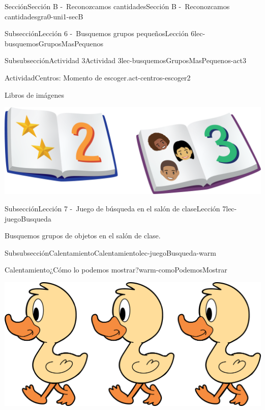 \documentclass[twoside,10pt,]{article}
\begin{document}
\begin{sectionptx}{Sección}{Sección B -~Reconozcamos cantidades}{}{Sección B -~Reconozcamos cantidades}{}{}{gra0-uni1-secB}
\begin{subsectionptx}{Subsección}{Lección 6 -~Busquemos grupos pequeños}{}{Lección 6}{}{}{lec-busquemosGruposMasPequenos}
\begin{subsubsectionptx}{Subsubsección}{Actividad 3}{}{Actividad 3}{}{}{lec-busquemosGruposMasPequenos-act3}
\begin{activity}{Actividad}{Centros: Momento de escoger.}{act-centros-escoger2}
\begin{sidebyside}{2}{0.025}{0.025}{0.05}
\begin{sbspanel}{0.45}%
Libros de imágenes%
\par
\includegraphics[width=\linewidth]{external/png-source/K.1.D Beta Student Workbooks.Books.png}
\end{sbspanel}%
\end{sidebyside}%
\end{activity}%
\end{subsubsectionptx}
\end{subsectionptx}
%
%
\typeout{************************************************}
\typeout{************************************************}
%
\begin{subsectionptx}{Subsección}{Lección 7 -~Juego de búsqueda en el salón de clase}{}{Lección 7}{}{}{lec-juegoBusqueda}
\begin{introduction}{}%
Busquemos grupos de objetos en el salón de clase.%
\end{introduction}%
%
%
\typeout{************************************************}
\typeout{************************************************}
%
\begin{subsubsectionptx}{Subsubsección}{Calentamiento}{}{Calentamiento}{}{}{lec-juegoBusqueda-warm}
\begin{exploration}{Calentamiento}{¿Cómo lo podemos mostrar?}{warm-comoPodemosMostrar}%
\begin{image}{0.2}{0.6}{0.2}{}%
\includegraphics[width=\linewidth]{external/png-source/3 ducks.png}

\end{image}
\end{exploration}
\end{subsubsectionptx}
\end{subsectionptx}
\end{sectionptx}
\end{document}
